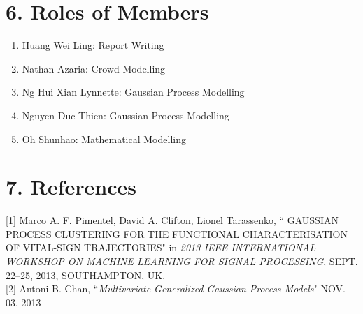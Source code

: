 \documentclass[letterpaper]{article}
\begin{document}
\section{6. Roles of Members}
\begin{enumerate}
\item Huang Wei Ling: Report Writing
\item Nathan Azaria: Crowd Modelling 
\item Ng Hui Xian Lynnette: Gaussian Process Modelling
\item Nguyen Duc Thien: Gaussian Process Modelling
\item Oh Shunhao: Mathematical Modelling
\end{enumerate}

\section{7.  References}

[1] Marco A. F. Pimentel, David A. Clifton, Lionel Tarassenko, `` GAUSSIAN PROCESS CLUSTERING FOR THE FUNCTIONAL CHARACTERISATION OF VITAL-SIGN TRAJECTORIES"
 in {\it 2013 IEEE INTERNATIONAL WORKSHOP ON MACHINE LEARNING FOR SIGNAL PROCESSING}, SEPT. 22–25, 2013, SOUTHAMPTON, UK. \\

[2] Antoni B. Chan, ``{\it Multivariate Generalized Gaussian Process Models}" NOV. 03, 2013
\end{document}
